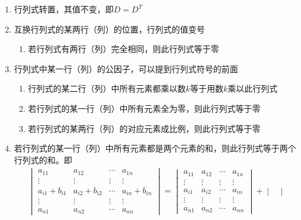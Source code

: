 \documentclass[12pt]{book}
\begin{document}
\begin{enumerate}[1.]
    \item 行列式转置，其值不变，即$ D= D^T$
    \item 互换行列式的某两行（列）的位置，行列式的值变号
          \begin{enumerate}[(1)]
              \item 若行列式有两行（列）完全相同，则此行列式等于零
          \end{enumerate}
    \item 行列式中某一行（列）的公因子，可以提到行列式符号的前面
          \begin{enumerate}[(1)]
              \item 行列式的某二行（列）中所有元素都乘以数$k$等于用数$k$乘以此行列式
              \item 若行列式的某一行（列）中所有元素全为零，则此行列式等于零
              \item 若行列式的某两行（列）的对应元素成比例，则此行列式等于零
          \end{enumerate}
    \item 若行列式的某一行（列）中所有元素都是两个元素的和，则此行列式等于两个行列式的和。即
          \begin{gather*}
              \begin{vmatrix}
                  a_{11}        & a_{12}        & \cdots & a_{1n}        \\
                  \vdots        & \vdots        & \vdots & \vdots        \\
                  a_{i1}+b_{i1} & a_{i2}+b_{i2} & \cdots & a_{in}+b_{in} \\
                  \vdots        & \vdots        & \vdots & \vdots        \\
                  a_{n1}        & a_{n2}        & \cdots & a_{nn}
              \end{vmatrix}
              = \begin{vmatrix}
                  a_{11} & a_{12} & \cdots & a_{1n} \\
                  \vdots & \vdots & \vdots & \vdots \\
                  a_{i1} & a_{i2} & \cdots & a_{in} \\
                  \vdots & \vdots & \vdots & \vdots \\
                  a_{n1} & a_{n2} & \cdots & a_{nn}
              \end{vmatrix} +
              \begin{vmatrix}

\end{vmatrix}
\end{gather*}
\end{enumerate}
\end{document}
